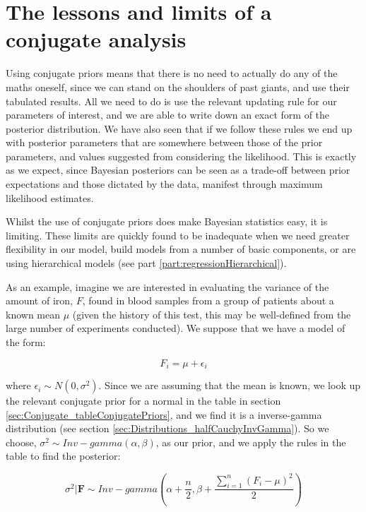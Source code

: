 \documentclass[11pt,fullpage]{book}
\begin{document}
\section{The lessons and limits of a conjugate analysis}
Using conjugate priors means that there is no need to actually do any of the maths oneself, since we can stand on the shoulders of past giants, and use their tabulated results. All we need to do is use the relevant updating rule for our parameters of interest, and we are able to write down an exact form of the posterior distribution. We have also seen that if we follow these rules we end up with posterior parameters that are somewhere between those of the prior parameters, and values suggested from considering the likelihood. This is exactly as we expect, since Bayesian posteriors can be seen as a trade-off between prior expectations and those dictated by the data, manifest through maximum likelihood estimates.

Whilst the use of conjugate priors does make Bayesian statistics easy, it is limiting. These limits are quickly found to be inadequate when we need greater flexibility in our model, build models from a number of basic components, or are using hierarchical models (see part \ref{part:regressionHierarchical}). 

As an example, imagine we are interested in evaluating the variance of the amount of iron, $F$, found in blood samples from a group of patients about a known mean $\mu$ (given the history of this test, this may be well-defined from the large number of experiments conducted). We suppose that we have a model of the form:

\begin{equation}
F_i = \mu + \epsilon_i
\end{equation}

where $\epsilon_i\sim N(0,\sigma^2)$. Since we are assuming that the mean is known, we look up the relevant conjugate prior for a normal in the table in section \ref{sec:Conjugate_tableConjugatePriors}, and we find it is a inverse-gamma distribution (see section \ref{sec:Distributions_halfCauchyInvGamma}). So we choose, $\sigma^2 \sim Inv-gamma(\alpha,\beta)$, as our prior, and we apply the rules in the table to find the posterior:

\begin{equation}
\sigma^2|\boldsymbol{F} \sim Inv-gamma\left(\alpha+ \frac{n}{2}, \beta + \frac{\sum\limits_{i=1}^{n}(F_i-\mu)^2}{2}\right)
\end{equation}
\end{document}
